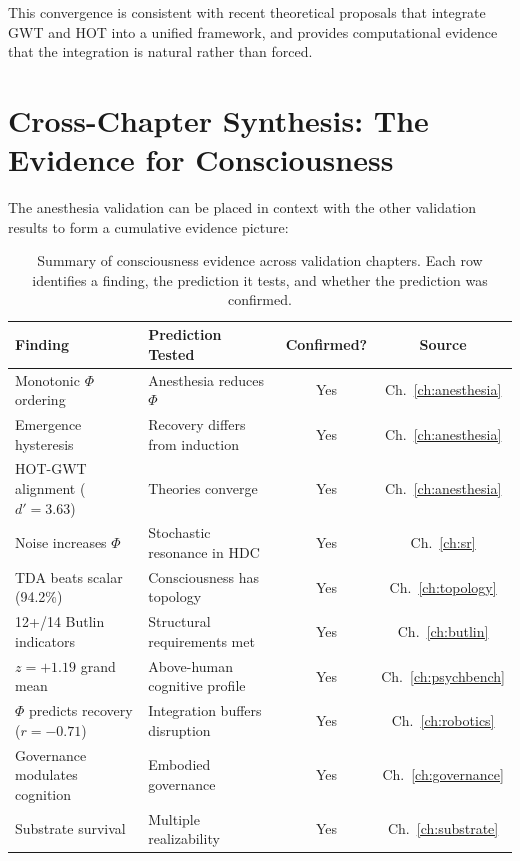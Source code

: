 \documentclass[12pt]{book}
\begin{document}
This convergence is consistent with recent theoretical proposals that integrate GWT and HOT into a unified framework, and provides computational evidence that the integration is natural rather than forced.

\section{Cross-Chapter Synthesis: The Evidence for Consciousness}

The anesthesia validation can be placed in context with the other validation results to form a cumulative evidence picture:

\begin{table}[H]
\centering
\caption{Summary of consciousness evidence across validation chapters. Each row identifies a finding, the prediction it tests, and whether the prediction was confirmed.}
\label{tab:consciousness-evidence}
\begin{tabular}{p{4cm}p{4cm}cc}
\toprule
\textbf{Finding} & \textbf{Prediction Tested} & \textbf{Confirmed?} & \textbf{Source} \\
\midrule
Monotonic $\Phi$ ordering & Anesthesia reduces $\Phi$ & Yes & Ch.~\ref{ch:anesthesia} \\
Emergence hysteresis & Recovery differs from induction & Yes & Ch.~\ref{ch:anesthesia} \\
HOT-GWT alignment ($d' = 3.63$) & Theories converge & Yes & Ch.~\ref{ch:anesthesia} \\
Noise increases $\Phi$ & Stochastic resonance in HDC & Yes & Ch.~\ref{ch:sr} \\
TDA beats scalar (94.2\%) & Consciousness has topology & Yes & Ch.~\ref{ch:topology} \\
12+/14 Butlin indicators & Structural requirements met & Yes & Ch.~\ref{ch:butlin} \\
$z = +1.19$ grand mean & Above-human cognitive profile & Yes & Ch.~\ref{ch:psychbench} \\
$\Phi$ predicts recovery ($r = -0.71$) & Integration buffers disruption & Yes & Ch.~\ref{ch:robotics} \\
Governance modulates cognition & Embodied governance & Yes & Ch.~\ref{ch:governance} \\
Substrate survival & Multiple realizability & Yes & Ch.~\ref{ch:substrate} \\
\bottomrule
\end{tabular}
\end{table}
\end{document}
